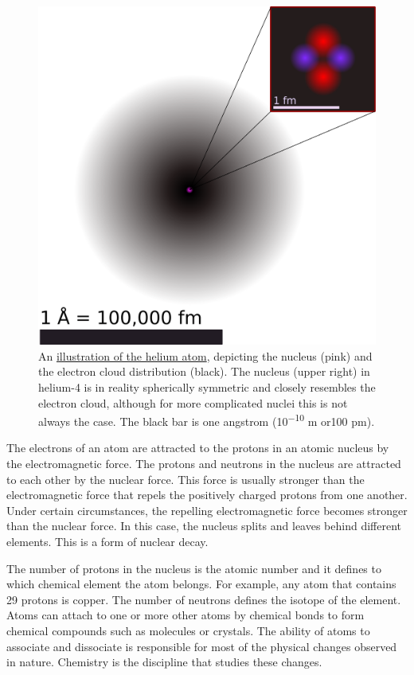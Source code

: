\begin{figure}

{\centering \includegraphics[width=0.7\linewidth]{./figures/chemistry/Helium_atom_QM} 

}

\caption{An \href{https://commons.wikimedia.org/wiki/File:Helium_atom_QM.svg}{illustration of the helium atom}, depicting the nucleus (pink) and the electron cloud distribution (black). The nucleus (upper right) in helium-4 is in reality spherically symmetric and closely resembles the electron cloud, although for more complicated nuclei this is not always the case. The black bar is one angstrom (10\textsuperscript{−10} m or100 pm).}\label{fig:atomcartoon}
\end{figure}

The electrons of an atom are attracted to the protons in an atomic nucleus by the electromagnetic force. The protons and neutrons in the nucleus are attracted to each other by the nuclear force. This force is usually stronger than the electromagnetic force that repels the positively charged protons from one another. Under certain circumstances, the repelling electromagnetic force becomes stronger than the nuclear force. In this case, the nucleus splits and leaves behind different elements. This is a form of nuclear decay.

The number of protons in the nucleus is the atomic number and it defines to which chemical element the atom belongs. For example, any atom that contains 29 protons is copper. The number of neutrons defines the isotope of the element. Atoms can attach to one or more other atoms by chemical bonds to form chemical compounds such as molecules or crystals. The ability of atoms to associate and dissociate is responsible for most of the physical changes observed in nature. Chemistry is the discipline that studies these changes.

